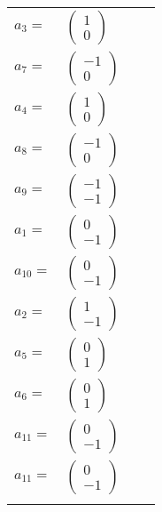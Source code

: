 \documentclass[1p]{elsarticle_modified}
\theoremstyle{definition}
\begin{document}
\begin{tabular}{m{7pt} m{180pt} m{7pt} m{180pt} }
\flushright $a_{3}=$&$\begin{pmatrix}1\\0\end{pmatrix}$ \\
\flushright $a_{7}=$&$\begin{pmatrix}-1\\0\end{pmatrix}$ \\
\flushright $a_{4}=$&$\begin{pmatrix}1\\0\end{pmatrix}$ \\
\flushright $a_{8}=$&$\begin{pmatrix}-1\\0\end{pmatrix}$ \\
\flushright $a_{9}=$&$\begin{pmatrix}-1\\-1\end{pmatrix}$ \\
\flushright $a_{1}=$&$\begin{pmatrix}0\\-1\end{pmatrix}$ \\
\flushright $a_{10}=$&$\begin{pmatrix}0\\-1\end{pmatrix}$ \\
\flushright $a_{2}=$&$\begin{pmatrix}1\\-1\end{pmatrix}$ \\
\flushright $a_{5}=$&$\begin{pmatrix}0\\1\end{pmatrix}$ \\
\flushright $a_{6}=$&$\begin{pmatrix}0\\1\end{pmatrix}$ \\
\flushright $a_{11}=$&$\begin{pmatrix}0\\-1\end{pmatrix}$\\ \flushright $a_{11}=$&$\begin{pmatrix}0\\-1\end{pmatrix}$\\&\end{tabular}
\end{document}
